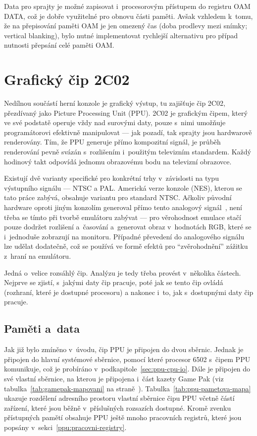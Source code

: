 \begin{note}
	Data pro sprajty je možné zapisovat i~procesorovým přístupem do registru OAM DATA, což je dobře využitelné pro obnovu části paměti. Avšak vzhledem k~tomu, že na přepisování paměti OAM je jen omezený čas (doba prodlevy mezi snímky; vertical blanking), bylo nutné implementovat rychlejší alternativu pro případ nutnosti přepsání celé paměti OAM.
\end{note}

\section{Grafický čip 2C02}
Nedílnou součástí herní konzole je grafický výstup, tu zajišťuje čip 2C02, přezdívaný jako Picture Processing Unit (PPU). 2C02 je grafickým čipem, který ve své podstatě operuje vždy nad surovými daty, pouze s~nimi umožňuje programátorovi efektivně manipulovat --- jak pozadí, tak sprajty jsou hardwarově renderovány. Tím, že PPU generuje přímo kompozitní signál, je průběh renderování pevně svázán s~rozlišením i~použitým televizním standardem. Každý hodinový takt odpovídá jednomu obrazovému bodu na televizní obrazovce.

Existují dvě varianty specifické pro konkrétní trhy v~závislosti na typu výstupního signálu --- NTSC a PAL. Americká verze konzole (NES), kterou se tato práce zabývá, obsahuje variantu pro standard NTSC. Ačkoliv původní hardware oproti jiným konzolím generoval přímo tento analogový signál~\cite{Nesdev:ntsc}, není třeba se tímto při tvorbě emulátoru zabývat --- pro věrohodnost emulace stačí pouze dodržet rozlišení a~časování a~generovat obraz v~hodnotách RGB, které se i~jednoduše zobrazují na monitoru. Případné převedení do analogového signálu lze udělat dodatečně, což se používá ve formě efektů pro \enquote{zvěrohodnění} zážitku z~hraní na emulátoru.

Jedná o~velice rozsáhlý čip. Analýzu je tedy třeba provést v~několika částech. Nejprve se zjistí, s~jakými daty čip pracuje, poté jak se tento čip ovládá (rozhraní, které je dostupné procesoru) a nakonec i~to, jak s~dostupnými daty čip pracuje.

\subsection{Paměti a~data}
Jak již bylo zmíněno v~úvodu, čip PPU je připojen do dvou sběrnic. Jednak je připojen do hlavní systémové sběrnice, pomocí které procesor 6502 s~čipem PPU komunikuje, což je probíráno v~podkapitole~\ref{sec:ppu-cpu-io}. Dále je připojen do své vlastní sběrnice, na kterou je připojena i~část kazety Game Pak (viz tabulka~\ref{tab:gamepak-mapovani} na straně~\pageref{tab:gamepak-mapovani}). Tabulka~\ref{tab:ppu-pametova-mapa} ukazuje rozdělení adresního prostoru vlastní sběrnice čipu PPU včetně částí zařízení, které jsou běžně v~příslušných rozsazích dostupné. Kromě zvenku přístupných pamětí obsahuje PPU ještě mnoho pracovních registrů, které jsou popsány v~sekci~\ref{ppu:pracovni-registry}.

